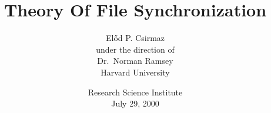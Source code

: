 \title{
Theory Of File Synchronization
}

\author{
El\H{o}d P. Csirmaz
\vspace{0.5in}\\
under the direction of\\
Dr.\ Norman Ramsey\\
Harvard University
\vspace{1in}
}


\date{
Research Science Institute\\
July 29, 2000
}
